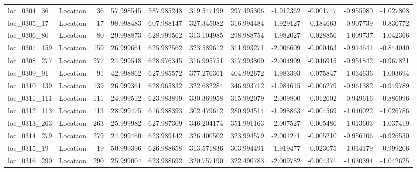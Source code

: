 \begin{tabular}{llrrrrrrrrr}
  loc_0304_36 &        Location &              36 &  57.998545 & 587.985248 &  319.547199 &    297.495306 &  -1.912362 &  -0.001747 &   -0.955980 &     -1.027808 \\
  loc_0305_17 &        Location &              17 &  98.998483 & 607.988147 &  327.345082 &    316.994484 &  -1.929127 &  -0.184663 &   -0.907739 &     -0.830772 \\
  loc_0306_80 &        Location &              80 &  29.998873 & 628.999562 &  313.104985 &    298.988754 &  -1.982027 &  -0.028856 &   -1.009737 &     -1.042366 \\
 loc_0307_159 &        Location &             159 &  26.999661 & 625.982562 &  323.589612 &    311.993271 &  -2.006609 &  -0.000463 &   -0.914641 &     -0.844040 \\
 loc_0308_277 &        Location &             277 &  24.999548 & 628.976345 &  316.995751 &    317.993800 &  -2.004909 &  -0.046915 &   -0.951842 &     -0.967821 \\
  loc_0309_91 &        Location &              91 &  42.998862 & 627.985572 &  377.276361 &    404.992672 &  -1.983393 &  -0.075847 &   -1.034636 &     -1.003694 \\
 loc_0310_139 &        Location &             139 &  26.999361 & 628.965832 &  322.682284 &    346.993712 &  -1.984615 &  -0.006279 &   -0.961382 &     -0.949789 \\
 loc_0311_111 &        Location &             111 &  24.999512 & 623.983899 &  330.369958 &    315.992079 &  -2.009800 &  -0.012602 &   -0.949616 &     -0.886096 \\
 loc_0312_113 &        Location &             113 &  28.999475 & 616.988393 &  302.479612 &    280.994514 &  -1.998863 &  -0.004569 &   -1.040022 &     -1.026786 \\
 loc_0313_263 &        Location &             263 &  25.999982 & 627.987309 &  346.204174 &    351.991163 &  -2.007527 &  -0.005486 &   -1.013603 &     -1.037419 \\
 loc_0314_279 &        Location &             279 &  24.999460 & 623.989142 &  326.400502 &    323.994579 &  -2.001271 &  -0.005210 &   -0.956106 &     -0.926550 \\
  loc_0315_19 &        Location &              19 &  50.999396 & 626.988658 &  313.571836 &    303.994491 &  -1.919477 &  -0.023075 &   -1.014179 &     -0.999206 \\
 loc_0316_290 &        Location &             290 &  25.999004 & 623.988692 &  320.757190 &    322.490783 &  -2.009782 &  -0.004371 &   -1.030394 &     -1.042625 \\

\end{tabular}
